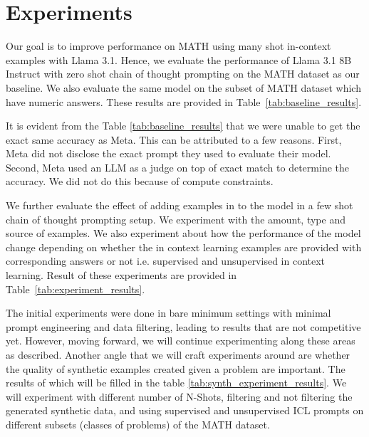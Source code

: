 \documentclass[twocolumn,11pt]{article}
\begin{document}
\section{Experiments} \label{sec:experiments}

Our goal is to improve performance on MATH using many shot in-context examples with Llama 3.1. Hence, we evaluate the performance of Llama 3.1 8B Instruct \cite{dubey2024llama3herdmodels} with zero shot chain of thought prompting on the MATH dataset as our baseline. We also evaluate the same model on the subset of MATH dataset which have numeric answers. These results are provided in Table~\ref{tab:baseline_results}. 

It is evident from the Table \ref{tab:baseline_results} that we were unable to get the exact same accuracy as Meta. This can be attributed to a few reasons. First, Meta did not disclose the exact prompt they used to evaluate their model. Second, Meta used an LLM as a judge on top of exact match to determine the accuracy. We did not do this because of compute constraints.

We further evaluate the effect of adding examples in to the model in a few shot chain of thought prompting setup. We experiment with the amount, type and source of examples. We also experiment about how the performance of the model change depending on whether the in context learning examples are provided with corresponding answers or not i.e. supervised and unsupervised in context learning. Result of these experiments are provided in Table~\ref{tab:experiment_results}.

The initial experiments were done in bare minimum settings with minimal prompt engineering and data filtering, leading to results that are not competitive yet. However, moving forward, we will continue experimenting along these areas as described. Another angle that we will craft experiments around are whether the quality of synthetic examples created given a problem are important. The results of which will be filled in the table \ref{tab:synth_experiment_results}. We will experiment with different number of N-Shots, filtering and not filtering the generated synthetic data, and using supervised and unsupervised ICL prompts on different subsets (classes of problems) of the MATH dataset.
\end{document}
